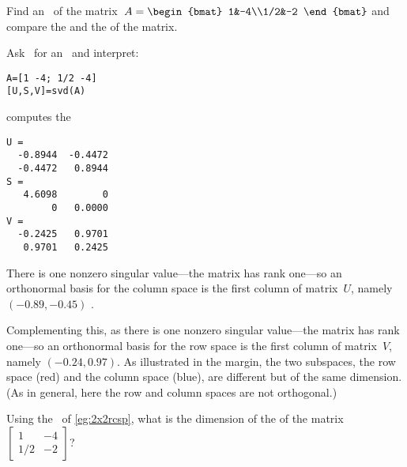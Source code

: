 \begin{example} \label{eg:2x2rcsp}
Find an \svd\ of the matrix~\(A=\begin{bmat} 1&-4\\1/2&-2 \end{bmat}\) and compare the  and the  of the matrix.
\begin{solution} 
Ask \script\ for an \svd\ and interpret:
\begin{verbatim}
A=[1 -4; 1/2 -4]
[U,S,V]=svd(A)
\end{verbatim}
\setbox\ajrqrbox\hbox{}%
\marginajrbox%
computes the \svd\ 
\begin{verbatim}
U =
  -0.8944  -0.4472
  -0.4472   0.8944
S =
   4.6098        0
        0   0.0000
V =
  -0.2425   0.9701
   0.9701   0.2425
\end{verbatim}
There is one nonzero singular value---the matrix has rank one---so an orthonormal basis for the column space is the first column of matrix~\(U\), namely \((-0.89,-0.45)\) \twodp.

%
Complementing this, as there is one nonzero singular value---the matrix has rank one---so an orthonormal basis for the row space is the first column of matrix~\(V\), namely \((-0.24,0.97)\).
As illustrated in the margin, the two subspaces, the row space (red) and the column space (blue), are different but of the same dimension.
(As in general, here the row and column spaces are not orthogonal.)
\end{solution}
\end{example}



\begin{activity}
Using the \svd\ of \cref{eg:2x2rcsp}, what is the dimension of the  of the matrix~\(\begin{bmatrix} 1&-4\\1/2&-2 \end{bmatrix}\)?
\actposs[4]1230
\end{activity}


